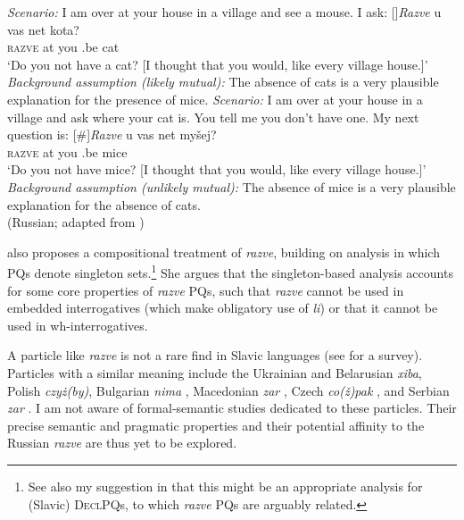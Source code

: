 \documentclass[output=paper,colorlinks,citecolor=brown]{langscibook}
\begin{document}
\begin{exe}
\ex
\begin{xlist}
\ex \textit{Scenario:} I am over at your house in a village and see a mouse. I ask:\label{sim:ex:razve-korotk-a}
\exi{}[]{\gll \textit{Razve} u vas net kota?\\
\textsc{razve} at you {\NEG}.be cat\\
\glt `Do you not have a cat? [I thought that you would, like every village house.]'\\
\textit{Background assumption (likely mutual):} The absence of cats is a very plausible explanation for the presence of mice.}
\ex \textit{Scenario:} I am over at your house in a village and ask where your cat is. You tell me you don’t have one. My next question is:\label{sim:ex:razve-korotk-b}
\exi{}[\#]{\gll \textit{Razve} u vas net myšej?\\
\textsc{razve} at you {\NEG}.be mice\\
\glt `Do you not have mice? [I thought that you would, like every village house.]'\\
\textit{Background assumption (unlikely mutual):}
The absence of mice is a very plausible explanation for the absence of cats.\\\hfill (Russian; adapted from \citealt{Korotkova2023})}
\end{xlist}
\end{exe}

\noindent\citet{Korotkova2023} also proposes a compositional treatment of \textit{razve}, building on  analysis in which PQs denote singleton sets.\footnote{See also my suggestion in  that this might be an appropriate analysis for (Slavic) \textsc{DeclPQ}s, to which \textit{razve} PQs are arguably related.} She argues that the singleton-based analysis accounts for some core properties of \textit{razve} PQs, such that \textit{razve} cannot be used in embedded interrogatives (which make obligatory use of \textit{li}) or that it cannot be used in wh-interrogatives.

A particle like \textit{razve} is not a rare find in Slavic languages (see \citealt{Logvinova2022} for a survey). Particles with a similar meaning include the Ukrainian and Belarusian \textit{xiba}, Polish \textit{czy\.{z}(by)}, Bulgarian \textit{nima} \citep{Tisheva2003}, Macedonian \textit{zar} \citep{Englund1977,Mitkovska.Buzarovska2024}, Czech \textit{co(ž)pak} \citep{Nekula1996,Sebestova.Mala2016,Stankova2023}, and Serbian \textit{zar} \citep{Rakic1984,Piper2005,Todorovic2023}. I am not aware of formal-semantic studies dedicated to these particles. Their precise semantic and pragmatic properties and their potential affinity to the Russian \textit{razve} are thus yet to be explored.
\end{document}

